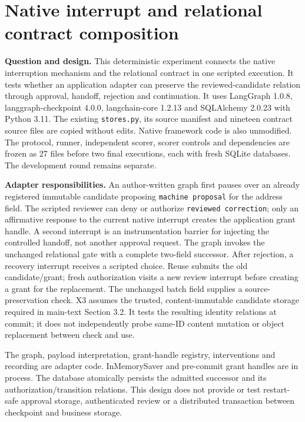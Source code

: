 \section{Native interrupt and relational contract composition}
\label{sec:a14-composition}

\textbf{Question and design.}
This deterministic experiment connects the native interruption mechanism and
the relational contract in one scripted execution. It tests whether an
application adapter can preserve the reviewed-candidate relation through
approval, handoff, rejection and continuation. It uses LangGraph 1.0.8,
langgraph-checkpoint 4.0.0, langchain-core 1.2.13 and SQLAlchemy 2.0.23 with
Python 3.11. The existing \texttt{stores.py}, its source manifest and nineteen
contract source files are copied without edits. Native framework code is also
unmodified. The protocol, runner, independent scorer, scorer controls and
dependencies are frozen as 27 files before two final executions, each with
fresh SQLite databases. The development round remains separate.

\textbf{Adapter responsibilities.}
An author-written graph first pauses over an already registered immutable
candidate proposing \texttt{machine proposal} for the address field. The
scripted reviewer can deny or authorize \texttt{reviewed correction}; only
an affirmative response to the current native interrupt creates the
application grant handle. A second interrupt is an instrumentation barrier
for injecting the controlled handoff, not another approval request.
The graph invokes the unchanged relational gate with a complete two-field
successor. After rejection, a recovery interrupt receives a scripted choice.
Reuse submits the old candidate/grant; fresh authorization visits a new
review interrupt before creating a grant for the replacement. The unchanged
batch field supplies a source-preservation check. X3 assumes the trusted,
content-immutable candidate storage required in main-text Section 3.2. It
tests the resulting identity relations at commit; it does not independently
probe same-ID content mutation or object replacement between check and use.

The graph, payload interpretation, grant-handle registry, interventions and
recording are adapter code. InMemorySaver and pre-commit grant handles are
in process. The database atomically persists the admitted successor and its
authorization/transition relations. This design does not provide or test
restart-safe approval storage, authenticated review or a distributed
transaction between checkpoint and business storage.

